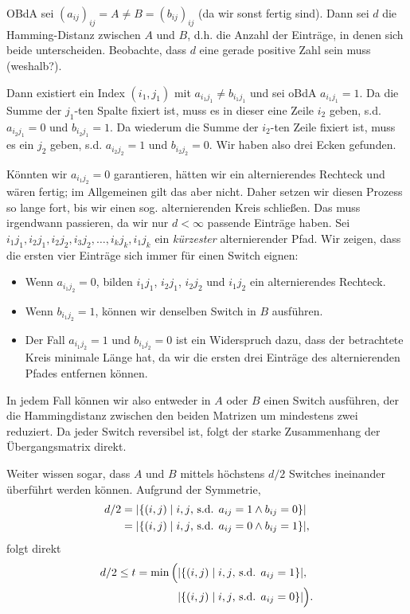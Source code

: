 \begin{theorem}
    OBdA sei $(a_{ij})_{ij} = A \ne B = (b_{ij})_{ij}$ (da wir sonst fertig sind).
    Dann sei $d$ die Hamming-Distanz zwischen $A$ und $B$, d.h. die Anzahl der Einträge, in denen sich beide unterscheiden.
    Beobachte, dass $d$ eine gerade positive Zahl sein muss (weshalb?).

    Dann existiert ein Index $(i_1, j_1)$ mit $a_{i_1j_1} \ne b_{i_1j_1}$ und sei oBdA $a_{i_1j_1} = 1$.
    Da die Summe der $j_1$-ten Spalte fixiert ist, muss es in dieser eine Zeile $i_2$ geben, s.d. $a_{i_2j_1} = 0$ und $b_{i_2j_1} = 1$.
    Da wiederum die Summe der $i_2$-ten Zeile fixiert ist, muss es ein $j_2$ geben, s.d. $a_{i_2j_2} = 1$ und $b_{i_2j_2} = 0$.
    Wir haben also drei Ecken gefunden.

    Könnten wir $a_{i_1j_2} = 0$ garantieren, hätten wir ein alternierendes Rechteck und wären fertig;
    im Allgemeinen gilt das aber nicht.
    Daher setzen wir diesen Prozess so lange fort, bis wir einen sog. alternierenden Kreis schließen.
    Das muss irgendwann passieren, da wir nur $d < \infty$ passende Einträge haben.
    Sei $i_1j_1, i_2j_1, i_2j_2, i_3j_2, \ldots, i_kj_k, i_1j_k$ ein \emph{kürzester} alternierender Pfad.
    Wir zeigen, dass die ersten vier Einträge sich immer für einen Switch eignen:
    \begin{itemize}
        \item Wenn $a_{i_1j_2} = 0$, bilden $i_1j_1$, $i_2j_1$, $i_2j_2$ und $i_1j_2$ ein alternierendes Rechteck.
        \item Wenn $b_{i_1j_2} = 1$, können wir denselben Switch in $B$ ausführen.
        \item Der Fall $a_{i_1j_2} = 1$ und $b_{i_1j_2} = 0$ ist ein Widerspruch dazu, dass der betrachtete Kreis minimale Länge hat, da wir die ersten drei Einträge des alternierenden Pfades entfernen können.
    \end{itemize}

    In jedem Fall können wir also entweder in $A$ oder $B$ einen Switch ausführen, der die Hammingdistanz zwischen den beiden Matrizen um mindestens zwei reduziert.
    Da jeder Switch reversibel ist, folgt der starke Zusammenhang der Übergangsmatrix direkt.

    Weiter wissen sogar, dass $A$ und $B$ mittels höchstens $d/2$ Switches ineinander überführt werden können.
    Aufgrund der Symmetrie,
    \begin{align}
        d/2 & = \lvert \left\{ (i, j) \mid i, j \text{, s.d. } a_{ij} = 1 \land b_{ij} = 0\right\}\rvert  \\
            & = \lvert \left\{ (i, j) \mid i, j \text{, s.d. } a_{ij} = 0 \land b_{ij} = 1\right\}\rvert,
    \end{align}
    folgt direkt
    \begin{align}
        d/2 \le t =  \min\Big(
         & \lvert \left\{ (i, j) \mid i, j \text{, s.d. } a_{ij} = 1\right\}\rvert,       \\
         & \lvert \left\{ (i, j) \mid i, j \text{, s.d. } a_{ij} = 0\right\}\rvert  \Big).
    \end{align}
\end{theorem}

